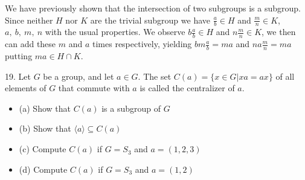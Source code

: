 \begin{mdframed}[style=darkAnswer,frametitle={Joe Starr}]
We have previously shown that the intersection of two subgroups is a subgroup.
Since neither $H$ nor $K $ are the trivial subgroup we have $\frac{a}{b}\in H$
and $\frac{m}{n}\in K$, $a,\ b,\ m,\ n$ with the usual properties. We observe
$b\frac{a}{b}\in H$ and $n\frac{m}{n}\in K$, we then can add these $m$ and
$a$ times respectively, yielding $bm\frac{a}{b}=ma$ and $na\frac{m}{n}=ma$
putting $ma\in H\cap K$.
\end{mdframed}
\newpage
\begin{mdframed}[style=darkQuesion]
19. Let $G$ be a group, and let $a \in G .$ The set
$C(a)=\{x \in G | x a=a x\}$ of all elements of $G$ that commute with $a$ is
called the centralizer of $a .$
\begin{itemize}
\item[]{(a) Show that  $C(a)$ is a subgroup of $G$}
\item[]{(b) Show that $\langle a\rangle \subseteq C(a)$}
\item[]{(c) Compute $C(a)$ if $G=S_{3}$ and $a=(1,2,3)$}
\item[]{(d) Compute $C(a)$ if $G=S_{3}$ and $a=(1,2)$}
\end{itemize}

\end{mdframed}

